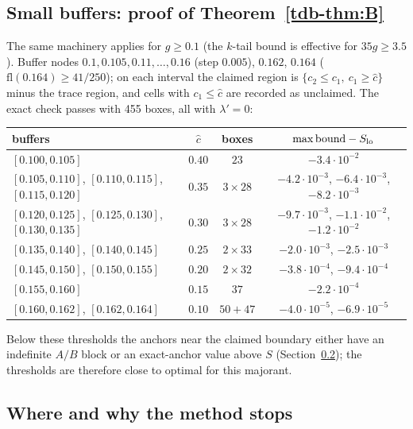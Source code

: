 \subsection{Small buffers: proof of Theorem~\ref{tdb-thm:B}}\label{tdb-sec:B}
The same machinery applies for $g\ge0.1$ (the $k$-tail bound is effective for $35g\ge3.5$). Buffer nodes $0.1,0.105,0.11,\dots,0.16$ (step $0.005$), $0.162$, $0.164$
($\mathrm{fl}(0.164)\ge41/250$); on each interval the claimed region is $\{c_2\le c_1,\ c_1\ge\hat c\}$ minus the trace region, and cells with
$c_1\le\hat c$ are recorded as unclaimed. The exact check passes with 455 boxes, all with $\lambda'=0$:
\begin{center}\small
\begin{tabular}{lccc}\toprule
buffers & $\hat c$ & boxes & $\max\text{bound}-S_{\rm lo}$\\\midrule
$[0.100,0.105]$ & $0.40$ & $23$ & $-3.4\cdot10^{-2}$\\
$[0.105,0.110]$, $[0.110,0.115]$, $[0.115,0.120]$ & $0.35$ & $3\times28$ & $-4.2\cdot10^{-3}$, $-6.4\cdot10^{-3}$, $-8.2\cdot10^{-3}$\\
$[0.120,0.125]$, $[0.125,0.130]$, $[0.130,0.135]$ & $0.30$ & $3\times28$ & $-9.7\cdot10^{-3}$, $-1.1\cdot10^{-2}$, $-1.2\cdot10^{-2}$\\
$[0.135,0.140]$, $[0.140,0.145]$ & $0.25$ & $2\times33$ & $-2.0\cdot10^{-3}$, $-2.5\cdot10^{-3}$\\
$[0.145,0.150]$, $[0.150,0.155]$ & $0.20$ & $2\times32$ & $-3.8\cdot10^{-4}$, $-9.4\cdot10^{-4}$\\
$[0.155,0.160]$ & $0.15$ & $37$ & $-2.2\cdot10^{-4}$\\
$[0.160,0.162]$, $[0.162,0.164]$ & $0.10$ & $50+47$ & $-4.0\cdot10^{-5}$, $-6.9\cdot10^{-5}$\\\bottomrule
\end{tabular}
\end{center}
Below these thresholds the anchors near the claimed boundary either have an indefinite $A/B$ block or an exact-anchor value above $S$
(Section~\ref{tdb-sec:obstruction}); the thresholds are therefore close to optimal for this majorant.

\subsection{Where and why the method stops}\label{tdb-sec:obstruction}

